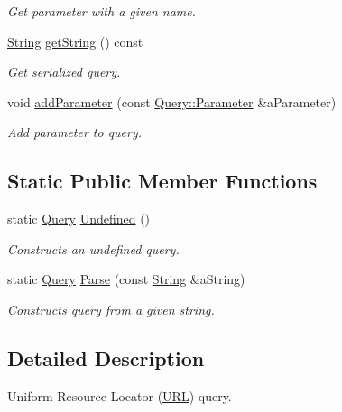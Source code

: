 \begin{DoxyCompactItemize}
\begin{DoxyCompactList}\small\item\em Get parameter with a given name. \end{DoxyCompactList}\item 
\hyperlink{namespacelibrary_1_1io_a7469b45835a4421045db344d6a5a1f85}{String} \hyperlink{classlibrary_1_1io_1_1url_1_1_query_a64def65d3297fd007265f23f49c8d27b}{get\+String} () const
\begin{DoxyCompactList}\small\item\em Get serialized query. \end{DoxyCompactList}\item 
void \hyperlink{classlibrary_1_1io_1_1url_1_1_query_aaaae1184a15d06b061dc38e779fb834e}{add\+Parameter} (const \hyperlink{classlibrary_1_1io_1_1url_1_1_query_1_1_parameter}{Query\+::\+Parameter} \&a\+Parameter)
\begin{DoxyCompactList}\small\item\em Add parameter to query. \end{DoxyCompactList}\end{DoxyCompactItemize}
\subsection*{Static Public Member Functions}
\begin{DoxyCompactItemize}
\item 
static \hyperlink{classlibrary_1_1io_1_1url_1_1_query}{Query} \hyperlink{classlibrary_1_1io_1_1url_1_1_query_acea48a0bfba96773f6db11d1a904a520}{Undefined} ()
\begin{DoxyCompactList}\small\item\em Constructs an undefined query. \end{DoxyCompactList}\item 
static \hyperlink{classlibrary_1_1io_1_1url_1_1_query}{Query} \hyperlink{classlibrary_1_1io_1_1url_1_1_query_aaff385aed5f4af758033066e4f7c70a2}{Parse} (const \hyperlink{namespacelibrary_1_1io_a7469b45835a4421045db344d6a5a1f85}{String} \&a\+String)
\begin{DoxyCompactList}\small\item\em Constructs query from a given string. \end{DoxyCompactList}\end{DoxyCompactItemize}


\subsection{Detailed Description}
Uniform Resource Locator (\hyperlink{classlibrary_1_1io_1_1_u_r_l}{U\+RL}) query. 

